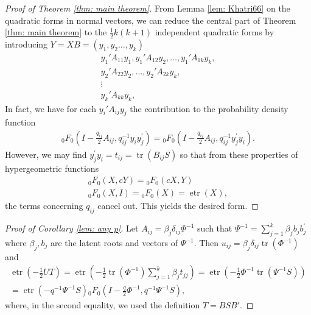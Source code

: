 \documentclass{amsart}
\theoremstyle{definition}
\numberwithin{equation}{section}
\begin{document}
\begin{proof}[Proof of Theorem \ref{thm: main theorem}]
    From Lemma \ref{lem: Khatri66} on the quadratic forms in normal vectors, we can reduce the central part of Theorem \ref{thm: main theorem} to the $\frac{1}{2}k(k+1)$ independent quadratic forms by introducing $ Y =  X B = ( y_{1}, y_{2}\dots,  y_{k})$
    \begin{equation*}
    \begin{aligned}
        {y}_1'{A}_{11}{y}_1, {y}_1'{A}_{12}{y}_2, \dots, {y}_1'{A}_{1k}{y}_k,\\
        {y}_2'{A}_{22}{y}_2, \dots, {y}_2'{A}_{2k}{y}_k, \\
        \vdots\qquad \\
        {y}_k'{A}_{kk}{y}_k,
    \end{aligned}
\end{equation*}
In fact, we have for each ${y}_i'{A}_{ij}{y}_j$ the contribution to the probability density function
\[\begin{aligned}
    {_{0}}F_{0}\left( I - \frac{q_{ij}}{2} A_{ij}, q_{ij}^{-1} y_{i} y_{j}^{\prime}\right) = {_{0}}F_{0}\left( I - \frac{q_{ij}}{2} A_{ij}, q_{ij}^{-1} y_{j}^{\prime} y_{i}\right).\end{aligned}\]
However, we may find $ y_{j}^{\prime} y_{i} = t_{ij} = \operatorname{tr} ( B_{ij} S)$ so that from these properties of hypergeometric functions
\[\begin{aligned}
    {}_{0}F_{0} ( X,c Y) = {}_{0}F_{0} (c X, Y)\\
    {}_{0}F_{0} ( X,  I) = {}_{0}F_{0} ( X) = \operatorname{etr}( X), 
\end{aligned}\]
the terms concerning $q_{ij}$ cancel out. This yields the desired form.
\end{proof}


\begin{proof}[Proof of Corollary \ref{lem: any p}]
    Let $ A_{ij} = \beta_{j}\delta_{ij}   \varPhi^{-1}$ such that $ \varPsi^{-1} = \sum_{j=1}^{k}\beta_j b_{j} b_{j}^{\prime}$ where $\beta_{j},  b_{j}$ are the latent roots and vectors of $ \varPsi^{-1}$. %
Then $u_{ij} = \beta_{j}\delta_{ij}\operatorname{tr} ( \varPhi^{-1})$ and 
\[\begin{aligned}
    \operatorname{etr}\left(-\frac{1}{2} U  T \right) = \operatorname{etr}\left(- \frac{1}{2}\operatorname{tr} ( \varPhi^{-1})\sum_{j=1}^{k}\beta_{j}t_{jj}\right)     = \operatorname{etr}\left(- \frac{1}{2} \varPhi^{-1}\operatorname{tr} ( \varPsi^{-1}  S)\right) \\
    = \operatorname{etr} \left(- q^{-1} \varPsi^{-1}  S\right){}_{0}F_{0} \left( I - \frac{q}{2} \varPhi^{-1}, q^{-1} \varPsi^{-1}  S\right),
\end{aligned}\]
where, in the second equality, we used the definition $ T =  B  S  B'$.
\end{proof}
\end{document}
